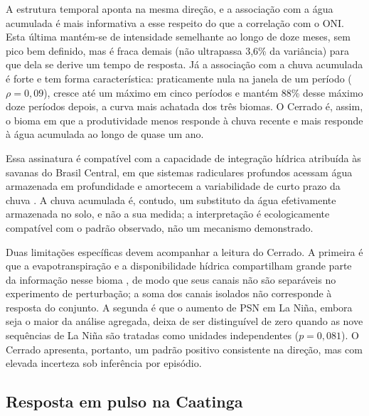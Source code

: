 \documentclass[a4paper,fleqn]{cas-sc}
\begin{document}
A estrutura temporal aponta na mesma direção, e a associação com a água acumulada é mais informativa a esse respeito do que a correlação com o ONI. Esta última mantém-se de intensidade semelhante ao longo de doze meses, sem pico bem definido, mas é fraca demais (não ultrapassa 3,6\% da variância) para que dela se derive um tempo de resposta. Já a associação com a chuva acumulada é forte e tem forma característica: praticamente nula na janela de um período ($\rho = 0{,}09$), cresce até um máximo em cinco períodos e mantém 88\% desse máximo doze períodos depois, a curva mais achatada dos três biomas. O Cerrado é, assim, o bioma em que a produtividade menos responde à chuva recente e mais responde à água acumulada ao longo de quase um ano.

Essa assinatura é compatível com a capacidade de integração hídrica atribuída às savanas do Brasil Central, em que sistemas radiculares profundos acessam água armazenada em profundidade e amortecem a variabilidade de curto prazo da chuva \citep{oliveira2005, bucci2008}. A chuva acumulada é, contudo, um substituto da água efetivamente armazenada no solo, e não a sua medida; a interpretação é ecologicamente compatível com o padrão observado, não um mecanismo demonstrado.

Duas limitações específicas devem acompanhar a leitura do Cerrado. A primeira é que a evapotranspiração e a disponibilidade hídrica compartilham grande parte da informação nesse bioma \citep{oliveira2026}, de modo que seus canais não são separáveis no experimento de perturbação; a soma dos canais isolados não corresponde à resposta do conjunto. A segunda é que o aumento de PSN em La Niña, embora seja o maior da análise agregada, deixa de ser distinguível de zero quando as nove sequências de La Niña são tratadas como unidades independentes ($p = 0{,}081$). O Cerrado apresenta, portanto, um padrão positivo consistente na direção, mas com elevada incerteza sob inferência por episódio.

\subsection{Resposta em pulso na Caatinga}
\end{document}
